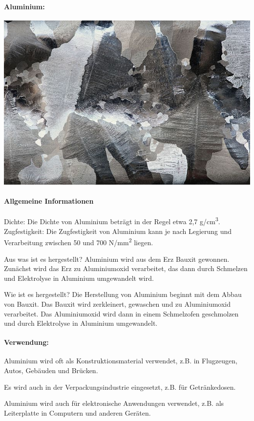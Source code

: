 \documentclass{article}
\begin{document}
\begin{multicols}{3}

\paragraph{Aluminium:}
\includegraphics[width=\linewidth]{alu.jpg}
\paragraph{Allgemeine Informationen}
Dichte: Die Dichte von Aluminium beträgt in der Regel etwa 2,7
g/cm\textsuperscript{3}.
Zugfestigkeit: Die Zugfestigkeit von Aluminium kann je nach Legierung und
Verarbeitung zwischen 50 und 700 N/mm\textsuperscript{2} liegen.

Aus was ist es hergestellt?
Aluminium wird aus dem Erz Bauxit gewonnen. Zunächst wird das Erz zu
Aluminiumoxid verarbeitet, das dann durch Schmelzen und Elektrolyse in
Aluminium umgewandelt wird.

Wie ist es hergestellt?
Die Herstellung von Aluminium beginnt mit dem Abbau von Bauxit. Das Bauxit wird
zerkleinert, gewaschen und zu Aluminiumoxid verarbeitet. Das Aluminiumoxid wird
dann in einem Schmelzofen geschmolzen und durch Elektrolyse in Aluminium
umgewandelt.

\paragraph{Verwendung:}
\begin{compactitem}
\item Aluminium wird oft als Konstruktionsmaterial verwendet, z.B. in
  Flugzeugen, Autos, Gebäuden und Brücken.
\item Es wird auch in der Verpackungsindustrie eingesetzt, z.B. für
  Getränkedosen.
\item Aluminium wird auch für elektronische Anwendungen verwendet, z.B. als
  Leiterplatte in Computern und anderen Geräten.
\end{compactitem}


\end{multicols}
\end{document}
